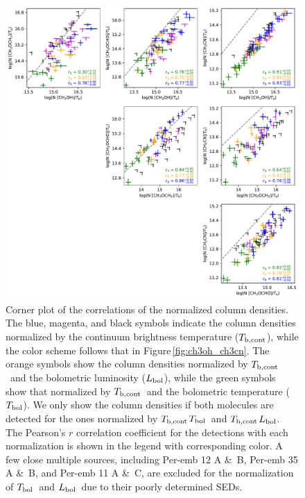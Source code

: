 \documentclass[twocolumn]{aastex62}
\newcommand{\lbol}{\mbox{$L_{\rm bol}$}}
\newcommand{\tbol}{\mbox{$T_{\rm bol}$}}
\newcommand{\tbc}{\mbox{$T_{\rm b, cont}$}}
\begin{document}
\begin{figure}[htbp!]
  \centering
  \includegraphics[width=\textwidth]{corner_Ncol_correlations_combined_norm.pdf}
  \caption{Corner plot of the correlations of the normalized column densities.  The blue, magenta, and black symbols indicate the column densities normalized by the continuum brightness temperature (\tbc), while the color scheme follows that in Figure\,\ref{fig:ch3oh_ch3cn}.  The orange symbols show the column densities normalized by \tbc\ and the bolometric luminosity (\lbol), while the green symbols show that normalized by \tbc\ and the bolometric temperature (\tbol).  We only show the column densities if both molecules are detected for the ones normalized by \tbc\tbol\ and \tbc\lbol.  The Pearson's $r$ correlation coefficient for the detections with each normalization is shown in the legend with corresponding color.  A few close multiple sources, including Per-emb 12 A \&\ B, Per-emb 35 A \&\ B, and Per-emb 11 A \&\ C, are excluded for the normalization of \tbol\ and \lbol\ due to their poorly determined SEDs.}
  \label{fig:corner_combined}
\end{figure}
\end{document}
